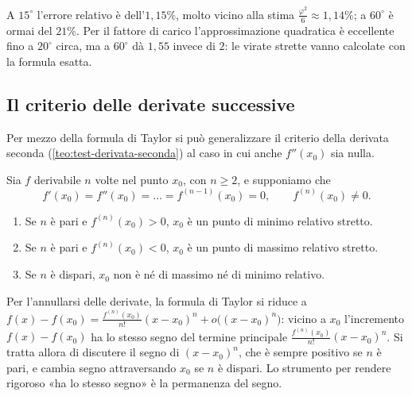 A $15^{\circ}$ l'errore relativo è dell'$1{,}15\%$, molto vicino alla stima
$\frac{\varphi^{2}}6\approx1{,}14\%$; a $60^{\circ}$ è ormai del $21\%$. Per il fattore di
carico l'approssimazione quadratica è eccellente fino a $20^{\circ}$ circa, ma a
$60^{\circ}$ dà $1{,}55$ invece di $2$: le virate strette vanno calcolate con la formula
esatta.

\subsection{Il criterio delle derivate successive}

Per mezzo della formula di Taylor si può generalizzare il criterio della derivata
seconda (\cref{teo:test-derivata-seconda}) al caso in cui anche $f''(x_{0})$ sia nulla.

\begin{teorema}\label{teo:criterio-ordine-n}
Sia $f$ derivabile $n$ volte nel punto $x_{0}$, con $n\ge2$, e supponiamo che
\begin{equation}\label{eq:criterio-ordine-n}
  f'(x_{0})=f''(x_{0})=\dots=f^{(n-1)}(x_{0})=0, \qquad f^{(n)}(x_{0})\neq0 .
\end{equation}
\begin{enumerate}[label=\textup{(\roman*)}]
  \item Se $n$ è pari e $f^{(n)}(x_{0})>0$, $x_{0}$ è un punto di minimo relativo stretto.
  \item Se $n$ è pari e $f^{(n)}(x_{0})<0$, $x_{0}$ è un punto di massimo relativo stretto.
  \item Se $n$ è dispari, $x_{0}$ non è né di massimo né di minimo relativo.
\end{enumerate}
\end{teorema}

\begin{schema}
\end{schema}

\begin{strategia}
Per l'annullarsi delle derivate, la formula di Taylor si riduce a
$f(x)-f(x_{0})=\frac{f^{(n)}(x_{0})}{n!}(x-x_{0})^{n}+o\bigl((x-x_{0})^{n}\bigr)$: vicino a
$x_{0}$ l'incremento $f(x)-f(x_{0})$ ha lo stesso segno del termine principale
$\frac{f^{(n)}(x_{0})}{n!}(x-x_{0})^{n}$. Si tratta allora di discutere il segno di
$(x-x_{0})^{n}$, che è sempre positivo se $n$ è pari, e cambia segno attraversando
$x_{0}$ se $n$ è dispari. Lo strumento per rendere rigoroso «ha lo stesso segno» è la
permanenza del segno.
\end{strategia}

